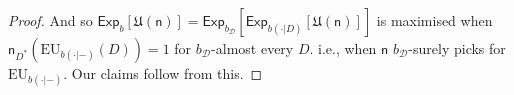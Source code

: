 \documentclass[a4paper]{article}
\newcommand\Exp{\mathsf{Exp}}
\newcommand\EU{\mathrm{EU}}
\newcommand\U{\mathfrak{U}} %
\newcommand{\D}{\mathcal{D}}
\newcommand{\Decs}{\mathcal{D}}
\newcommand{\n}{\mathsf{n}}
\renewcommand{\nu}{\n}
\renewcommand{\color}[1]{}
\newenvironment{colored}[1]{\leavevmode\color{#1}}{}
\newcommand\SetDelimiter[1][]{
	\nonscript\,#1\vert \allowbreak \nonscript\,\mathopen{}}
\providecommand\given{\SetDelimiter}
\newenvironment{CCM rewritten}
{\begingroup\color{blue}} %
{\endgroup}              %
\begin{document}
\begin{colored}{violet}
\begin{proof}
And so $\Exp_{b}[\U(\n)]=\Exp_{b_\Decs}[\Exp_{b(\cdot | D)}[\U(\n)]]$ is maximised when $\n_{D^*}(\EU_{b(\cdot|-)}(D))=1$ for $b_\Decs$-almost every $D$. 
i.e., when $\n$ $b_\Decs$-surely picks for $\EU_{b(\cdot|-)}$. 
Our claims follow from this.
%
%
%
%
%
%
%
%
%

\end{proof}
\end{colored}
\end{document}
